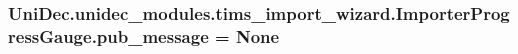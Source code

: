 \subsubsection[{pub\+\_\+message}]{\setlength{\rightskip}{0pt plus 5cm}Uni\+Dec.\+unidec\+\_\+modules.\+tims\+\_\+import\+\_\+wizard.\+Importer\+Progress\+Gauge.\+pub\+\_\+message = None}\label{namespace_uni_dec_1_1unidec__modules_1_1tims__import__wizard_1_1_importer_progress_gauge_ae77fa4fa3f1b45d7f125badf7485eecf}
